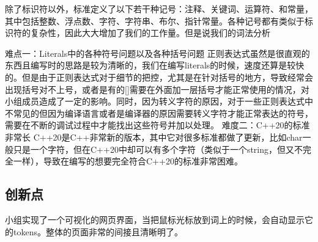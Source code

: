 除了标识符以外，标准定义了以下若干种记号：注释、关键词、运算符、和常量，其中包括整数、浮点数、字符、字符串、布尔、指针常量。各种记号都有类似于标识符的复杂性，因此大大增加了我们的工作量。但是说我们的词法分析


难点一：Literals中的各种符号问题以及各种括号问题
正则表达式虽然是很直观的东西且编写时的思路是较为清晰的，我们在编写literals的时候，速度还算是较快的。但是由于正则表达式对于细节的把控，尤其是在针对括号的地方，导致经常会出现括号对不上号，或者是有的[]需要在外面加一层括号才能正常使用的情况，对小组成员造成了一定的影响。同时，因为转义字符的原因，对于一些正则表达式中不常见的但因为编译语言或者是编译器的原因需要转义字符才能正常表达的符号，需要在不断的调试过程中才能找出这些符号并加以处理。
	难度二：C++20的标准非常长
C++20是C++非常新的版本，其中它对很多标准都做了更新，比如char一般只是一个字符，但在C++20中却可以有多个字符（类似于一个string，但又不完全一样），导致在编写的想要完全符合C++20的标准非常困难。

\subsection{创新点}

小组实现了一个可视化的网页界面，当把鼠标光标放到词上的时候，会自动显示它的tokens。整体的页面非常的间接且清晰明了。